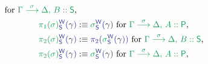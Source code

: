 \begin{defn}
\begin{align*}
  \text{ for \grm{\IISub{\sigma}{\Gamma}{\Delta,\, B :: \Sc}},} \\
\tqm{\grm{\pi_1(\sigma)}^\WW_\Sc(\blgamma)}
  &:\equiv \tqm{\grm{\sigma}^\WW_\Sc(\blgamma)}
  \text{ for \grm{\IISub{\sigma}{\Gamma}{\Delta,\, A :: \Pc}},} \\
\tqm{\grm{\pi_2(\sigma)}^\WW_\Sc(\blgamma)}
  &:\equiv \tqm{\pi_2(\grm{\sigma}^\WW_\Sc(\blgamma))}
  \text{ for \grm{\IISub{\sigma}{\Gamma}{\Delta,\, B :: \Sc}},} \\
\tqm{\grm{\pi_2(\sigma)}^\WW_\Sc(\blgamma)}
  &:\equiv \tqm{\grm{\sigma}^\WW_\Sc(\blgamma)}
  \text{ for \grm{\IISub{\sigma}{\Gamma}{\Delta,\, A :: \Pc}},}
\end{align*}

\end{defn}












